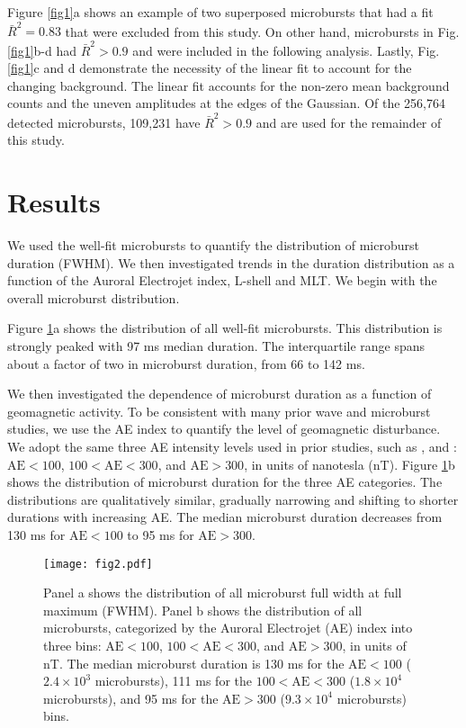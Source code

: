 \documentclass[draft]{agujournal2019}
\begin{document}
Figure \ref{fig1}a shows an example of two superposed microbursts that had a fit $\bar{R}^2 = 0.83$ that were excluded from this study. On other hand, microbursts in Fig. \ref{fig1}b-d had $\bar{R}^2 > 0.9$ and were included in the following analysis. Lastly, Fig. \ref{fig1}c and d demonstrate the necessity of the linear fit to account for the changing background. The linear fit accounts for the non-zero mean background counts and the uneven amplitudes at the edges of the Gaussian. Of the 256,764 detected microbursts, 109,231 have $\bar{R}^2 > 0.9$ and are used for the remainder of this study.

\section{Results}\label{results}
We used the well-fit microbursts to quantify the distribution of microburst duration (FWHM). We then investigated trends in the duration distribution as a function of the Auroral Electrojet index, L-shell and MLT. We begin with the overall microburst distribution.

Figure \ref{fig2}a shows the distribution of all well-fit microbursts. This distribution is strongly peaked with 97 ms median duration. The interquartile range spans about a factor of two in microburst duration, from 66 to 142 ms.

We then investigated the dependence of microburst duration as a function of geomagnetic activity. To be consistent with many prior wave and microburst studies, we use the AE index to quantify the level of geomagnetic disturbance. We adopt the same three AE intensity levels used in prior studies, such as , and : $\mathrm{AE} < 100$, $100 < \mathrm{AE} < 300$, and $\mathrm{AE} > 300$, in units of nanotesla (nT). Figure \ref{fig2}b shows the distribution of microburst duration for the three AE categories. The distributions are qualitatively similar, gradually narrowing and shifting to shorter durations with increasing AE. The median microburst duration decreases from 130 ms for $\mathrm{AE} < 100$ to 95 ms for $ \mathrm{AE} > 300$.

\begin{figure}
\noindent\texttt{[image: fig2.pdf]}
\caption{Panel a shows the distribution of all microburst full width at full maximum (FWHM). Panel b shows the distribution of all microbursts, categorized by the Auroral Electrojet (AE) index into three bins: $\mathrm{AE} < 100$, $100 < \mathrm{AE} < 300$, and $\mathrm{AE} > 300$, in units of nT. The median microburst duration is 130 ms for the $\mathrm{AE} < 100$ ($2.4\times 10^{3}$ microbursts), 111 ms for the $100 < \mathrm{AE} < 300$ ($1.8\times 10^{4}$ microbursts), and 95 ms for the $ \mathrm{AE} > 300$ ($9.3\times 10^{4}$ microbursts) bins.}
\label{fig2}
\end{figure}
\end{document}
